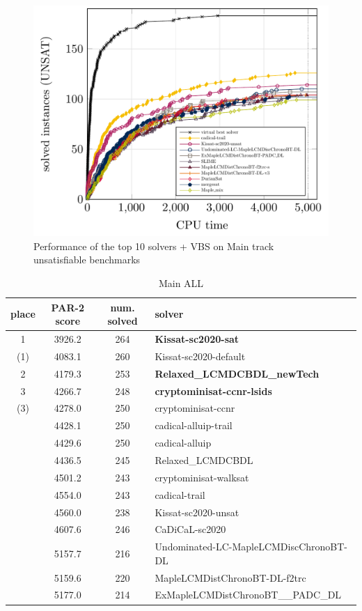 \documentclass{elsarticle}
\begin{document}
\begin{figure}
\centering
\includegraphics[width=.9\textwidth]{img/paper-main-top10-UNSAT.pdf}
\caption{Performance of the top 10 solvers + VBS on Main track unsatisfiable benchmarks}
\end{figure}

\begin{table}
\caption{Main ALL}
\label{tab:mainALL}
\begin{tabular}{cccl}
place & PAR-2 score & num. solved & solver \\
\hline
1  & 3926.2 & 264 & {\bf Kissat-sc2020-sat} \\
(1)& 4083.1 & 260 & Kissat-sc2020-default \\
2  & 4179.3 & 253 & {\bf Relaxed\_LCMDCBDL\_newTech} \\
3  & 4266.7 & 248 & {\bf cryptominisat-ccnr-lsids} \\
(3)& 4278.0 & 250 & cryptominisat-ccnr \\
   & 4428.1 & 250 & cadical-alluip-trail \\
   & 4429.6 & 250 & cadical-alluip \\
   & 4436.5 & 245 & Relaxed\_LCMDCBDL \\
   & 4501.2 & 243 & cryptominisat-walksat \\
   & 4554.0 & 243 & cadical-trail \\
   & 4560.0 & 238 & Kissat-sc2020-unsat \\
   & 4607.6 & 246 & CaDiCaL-sc2020 \\
   & 5157.7 & 216 & Undominated-LC-MapleLCMDiscChronoBT-DL \\
   & 5159.6 & 220 & MapleLCMDistChronoBT-DL-f2trc \\
   & 5177.0 & 214 & ExMapleLCMDistChronoBT\_\_PADC\_DL \\   
\end{tabular}
\end{table}
\end{document}
